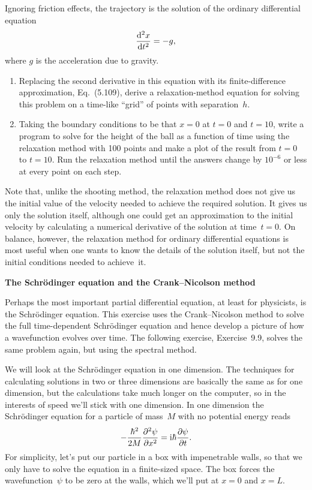 \documentclass[12pt]{article}
\begin{document}
\begin{exercises}
Ignoring friction effects, the trajectory is the solution of the ordinary
differential equation
\begin{displaymath}
{\mathrm{d}^2 x\over\mathrm{d}t^2} = -g,
\end{displaymath}
where $g$ is the acceleration due to gravity.
\begin{enumerate}\setlength{\itemsep}{0pt}
\item Replacing the second derivative in this equation with its
  finite-difference approximation, Eq.~(5.109), derive a relaxation-method
  equation for solving this problem on a time-like ``grid'' of points with
  separation~$h$.
\item Taking the boundary conditions to be that $x=0$ at $t=0$ and $t=10$,
  write a program to solve for the height of the ball as a function of time
  using the relaxation method with 100 points and make a plot of the result
  from $t=0$ to $t=10$.  Run the relaxation method until the answers change
  by $10^{-6}$ or less at every point on each step.
\end{enumerate}
Note that, unlike the shooting method, the relaxation method does not give
us the initial value of the velocity needed to achieve the required
solution.  It gives us only the solution itself, although one could get an
approximation to the initial velocity by calculating a numerical derivative
of the solution at time~$t=0$.  On balance, however, the relaxation method
for ordinary differential equations is most useful when one wants to know
the details of the solution itself, but not the initial conditions needed
to achieve~it.




\exercise \textbf{The Schr\"odinger equation and the Crank--Nicolson
  method}

\exskip Perhaps the most important partial differential equation, at least
for physicists, is the Schr\"odinger equation.  This exercise uses the
Crank--Nicolson method to solve the full time-dependent Schr\"odinger
equation and hence develop a picture of how a wavefunction evolves over
time.  The following exercise, Exercise~9.9, solves the same problem again,
but using the spectral method.

We will look at the Schr\"odinger equation in one dimension.  The
techniques for calculating solutions in two or three dimensions are
basically the same as for one dimension, but the calculations take much
longer on the computer, so in the interests of speed we'll stick with one
dimension.  In one dimension the Schr\"odinger equation for a particle of
mass~$M$ with no potential energy reads
\begin{displaymath}
-{\hbar^2\over2M} {\partial^2\psi\over\partial x^2}
  = \mathrm{i}\hbar {\partial\psi\over\partial t}.
\end{displaymath}
For simplicity, let's put our particle in a box with impenetrable
walls, so that we only have to solve the equation in a finite-sized space.
The box forces the wavefunction~$\psi$ to be zero at the walls, which we'll
put at $x=0$ and $x=L$.


\end{exercises}
\end{document}
